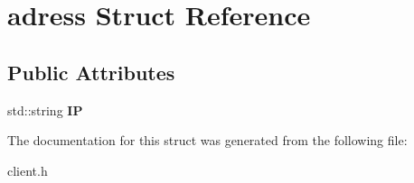 \hypertarget{structadress}{\section{adress Struct Reference}
\label{structadress}
}
\subsection*{Public Attributes}
\begin{DoxyCompactItemize}
\item 
\hypertarget{structadress_ab6b0e9c70729f3aa10e002bf59e4884b}{std\-::string {\bfseries I\-P}}\label{structadress_ab6b0e9c70729f3aa10e002bf59e4884b}

\end{DoxyCompactItemize}


The documentation for this struct was generated from the following file\-:\begin{DoxyCompactItemize}
\item 
client.\-h\end{DoxyCompactItemize}

